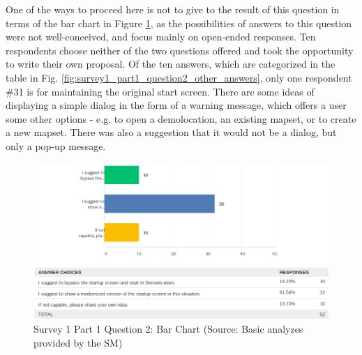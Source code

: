 \documentclass[a4paper,10pt,twoside]{article}
\begin{document}
One of the ways to proceed here is not to give to the result of this question in terms of the bar chart in Figure \ref{fig:survey1_part1_question2_histogram_sm}, as the possibilities of answers to this question were not well-conceived, and focus mainly on open-ended responses. Ten respondents choose neither of the two questions offered and took the opportunity to write their own proposal. Of the ten answers, which are categorized in the table in Fig. \ref{fig:survey1_part1_question2_other_answers}, only one respondent \#31 is for maintaining the original start screen. There are some ideas of displaying a simple dialog in the form of a warning message, which offers a user some other options - e.g. to open a demolocation, an existing mapset, or to create a new mapset. There was also a suggestion that it would not be a dialog, but only a pop-up message.

\vspace{0.3cm}
\begin{figure}[hbt!] 
\begin{center}
\includegraphics[width=17cm]{../surveys/analyzed_data/survey1_part1_question2_histogram_sm.png} 
\caption[Survey 1 Part 1 Question 2: Bar Chart]{Survey 1 Part 1 Question 2: Bar Chart (Source: Basic analyzes provided by the SM)}
\label{fig:survey1_part1_question2_histogram_sm}
\end{center}
\end{figure}
\end{document}
